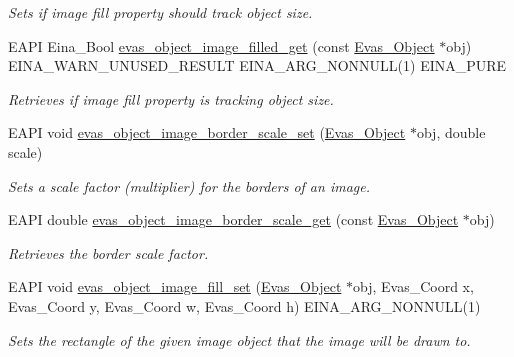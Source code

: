 \begin{DoxyCompactItemize}
\begin{DoxyCompactList}\small\item\em Sets if image fill property should track object size. \item\end{DoxyCompactList}\item 
EAPI Eina\_\-Bool \hyperlink{group__Evas__Object__Image_ga3fbe9f33ccc93a5c45ffa3b26019694e}{evas\_\-object\_\-image\_\-filled\_\-get} (const \hyperlink{group__Evas__Object__Group_ga9e19e6dd1f517a0ba437c0114d3e7c97}{Evas\_\-Object} $\ast$obj) EINA\_\-WARN\_\-UNUSED\_\-RESULT EINA\_\-ARG\_\-NONNULL(1) EINA\_\-PURE
\begin{DoxyCompactList}\small\item\em Retrieves if image fill property is tracking object size. \item\end{DoxyCompactList}\item 
EAPI void \hyperlink{group__Evas__Object__Image_gaba00498563648d2d3934e7e75449abd0}{evas\_\-object\_\-image\_\-border\_\-scale\_\-set} (\hyperlink{group__Evas__Object__Group_ga9e19e6dd1f517a0ba437c0114d3e7c97}{Evas\_\-Object} $\ast$obj, double scale)
\begin{DoxyCompactList}\small\item\em Sets a scale factor (multiplier) for the borders of an image. \item\end{DoxyCompactList}\item 
EAPI double \hyperlink{group__Evas__Object__Image_ga7cc1bf948a8a5d61c703211f0bd5d2dc}{evas\_\-object\_\-image\_\-border\_\-scale\_\-get} (const \hyperlink{group__Evas__Object__Group_ga9e19e6dd1f517a0ba437c0114d3e7c97}{Evas\_\-Object} $\ast$obj)
\begin{DoxyCompactList}\small\item\em Retrieves the border scale factor. \item\end{DoxyCompactList}\item 
EAPI void \hyperlink{group__Evas__Object__Image_ga7182040bc16e68d3bbce3bd0f8ee8034}{evas\_\-object\_\-image\_\-fill\_\-set} (\hyperlink{group__Evas__Object__Group_ga9e19e6dd1f517a0ba437c0114d3e7c97}{Evas\_\-Object} $\ast$obj, Evas\_\-Coord x, Evas\_\-Coord y, Evas\_\-Coord w, Evas\_\-Coord h) EINA\_\-ARG\_\-NONNULL(1)
\begin{DoxyCompactList}\small\item\em Sets the rectangle of the given image object that the image will be drawn to. \item\end{DoxyCompactList}\item 

\end{DoxyCompactItemize}
